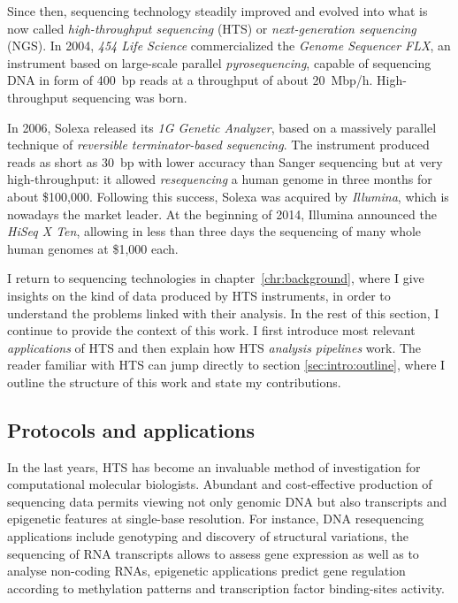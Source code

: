 Since then, sequencing technology steadily improved and evolved into what is now called \emph{high-throughput sequencing} (HTS) or \emph{next-generation sequencing} (NGS).
In 2004, \emph{454 Life Science} commercialized the \emph{Genome Sequencer FLX}, an instrument based on large-scale parallel \emph{pyrosequencing}, capable of sequencing DNA in form of 400~bp reads at a throughput of about 20~Mbp/h.
High-throughput sequencing was born.

In 2006, Solexa released its \emph{1G Genetic Analyzer}, based on a massively parallel technique of \emph{reversible terminator-based sequencing}.
The instrument produced reads as short as 30~bp with lower accuracy than Sanger sequencing but at very high-throughput: it allowed \emph{resequencing} a human genome in three months for about \$100,000.
Following this success, Solexa was acquired by \emph{Illumina}, which is nowadays the market leader.
At the beginning of 2014, Illumina announced the \emph{HiSeq X Ten}, allowing in less than three days the sequencing of many whole human genomes at \$1,000 each.


I return to sequencing technologies in chapter~\ref{chr:background}, where I give insights on the kind of data produced by HTS instruments, in order to understand the problems linked with their analysis.
In the rest of this section, I continue to provide the context of this work.
I first introduce most relevant \emph{applications} of HTS and then explain how HTS \emph{analysis pipelines} work.
The reader familiar with HTS can jump directly to section \ref{sec:intro:outline}, where I outline the structure of this work and state my contributions.

\subsection{Protocols and applications}

In the last years, HTS has become an invaluable method of investigation for computational molecular biologists.
Abundant and cost-effective production of sequencing data permits viewing not only genomic DNA but also transcripts and epigenetic features at single-base resolution.
For instance, DNA resequencing applications include genotyping and discovery of structural variations, the sequencing of RNA transcripts allows to assess gene expression as well as to analyse non-coding RNAs, epigenetic applications predict gene regulation according to methylation patterns and transcription factor binding-sites activity.

